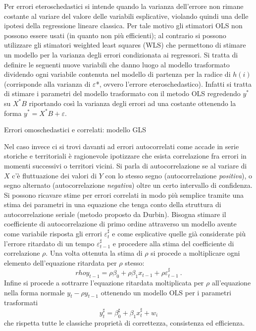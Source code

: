 \documentclass[a4page, 11pt]{article} %
\begin{document}
Per errori eteroschedastici si intende quando la varianza dell’errore non rimane costante al variare del valore delle variabili esplicative, violando quindi una delle ipotesi della regressione lineare classica. Per tale motivo gli stimatori OLS non possono essere usati (in quanto non più efficienti); al contrario si possono utilizzare gli stimatori weighted least squares (WLS) che permettono di stimare un modello per la varianza degli errori condizionata ai regressori. 
Si tratta di definire le seguenti nuove variabili che danno luogo al modello trasformato dividendo ogni variabile contenuta nel modello di partenza per la radice di $h(i)$ (corrisponde alla varianza di $\varepsilon$*, ovvero l'errore eteroschedastico). 
Infatti si tratta di stimare i parametri del modello trasformato con il metodo OLS regredendo $y^*$ su $X^*B$ riportando così la varianza degli errori ad una costante ottenendo la forma $y^* = X^*B + \varepsilon$.
\newline
\begin{itshape}
Errori omoschedastici e correlati: modello GLS
\end{itshape}

Nel caso invece ci si trovi davanti ad errori autocorrelati come accade in serie storiche e territoriali è ragionevole ipotizzare che esista correlazione fra errori in momenti successivi o territori vicini. Si parla di autocorrelazione se al variare di $X$ c'è fluttuazione dei valori di $Y$ con lo stesso segno (autocorrelazione \textit{positiva}), o segno alternato (autocorrelazione \textit{negativa}) oltre un certo intervallo di confidenza. Si possono ricavare stime per errori correlati in modo più semplice tramite una stima dei parametri in una equazione che tenga conto della struttura di autocorrelazione seriale (metodo proposto da Durbin). Bisogna stimare il coefficiente di autocorrelazione di primo ordine attraverso un modello avente come variabile risposta gli errori $\varepsilon_t^\sharp$ e come esplicative quelle già considerate più l’errore ritardato di un tempo $\varepsilon_{t-1}^\sharp$ e procedere alla stima del coefficiente di correlazione $\rho$. Una volta ottenuta la stima di $\rho$ si procede a moltiplicare ogni elemento dell'equazione ritardata per $\rho$ stesso: 
\begin{equation*}
rho y_{t-1} = \rho\beta_0 + \rho\beta_1 x_{t-1} +\rho\varepsilon_{t-1}^\sharp \ .
\end{equation*}
Infine si procede a sottrarre l'equazione ritardata moltiplicata per $\rho$ all'equazione nella forma normale $y_t - \rho y_{t-1}$ ottenendo un modello OLS per i parametri trasformati 
\begin{equation*}
y_t^\sharp = \beta_0^\sharp + \beta_1 x_t^\sharp + w_i
\end{equation*} 
che rispetta tutte le classiche proprietà di correttezza, consistenza ed efficienza. 
\end{document}

